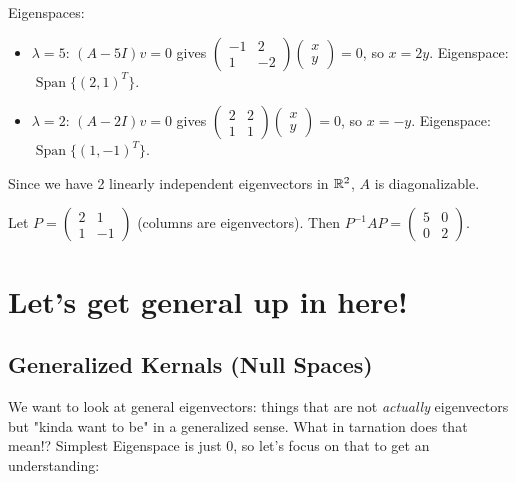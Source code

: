 \documentclass{report}
\begin{document}
\begin{solution}
Eigenspaces:
\begin{itemize}
\item \(\lambda = 5\): \((A - 5I)v = 0\) gives \(\begin{pmatrix} -1 & 2 \\ 1 & -2 \end{pmatrix}\begin{pmatrix} x \\ y \end{pmatrix} = 0\), so \(x = 2y\). Eigenspace: \(\operatorname{Span}\{(2, 1)^T\}\).
\item \(\lambda = 2\): \((A - 2I)v = 0\) gives \(\begin{pmatrix} 2 & 2 \\ 1 & 1 \end{pmatrix}\begin{pmatrix} x \\ y \end{pmatrix} = 0\), so \(x = -y\). Eigenspace: \(\operatorname{Span}\{(1, -1)^T\}\).
\end{itemize}

Since we have 2 linearly independent eigenvectors in \(\RR^2\), \(A\) is diagonalizable.

Let \(P = \begin{pmatrix} 2 & 1 \\ 1 & -1 \end{pmatrix}\) (columns are eigenvectors). Then \(P^{-1}AP = \begin{pmatrix} 5 & 0 \\ 0 & 2 \end{pmatrix}\).
\end{solution}


\section{Let's get general up in here!}

\subsection{Generalized Kernals (Null Spaces)}
We want to look at general eigenvectors: things that are not \textit{actually} eigenvectors but "kinda want to be" in a generalized sense. What in tarnation does that mean!? Simplest Eigenspace is just \( 0 \), so let's focus on that to get an understanding:

\end{document}
